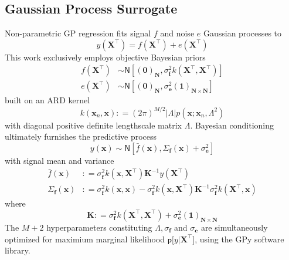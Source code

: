 \documentclass[preprint,12pt]{elsarticle}
\newcommand*{\M}[1]{\ensuremath{#1}\xspace}
\newcommand*{\vr}[1]{\M{\mathbf{#1}}}
\newcommand*{\deq}{\M{\mathrel{\mathop:}=}}
\newcommand*{\gauss}[2]{\mathsf{N}\!\left\lbrack{} #1 , #2 \right\rbrack}
\newcommand*{\modulus}[1]{\M{\left\lvert#1\right\rvert}}
\begin{document}
        \subsection{Gaussian Process Surrogate} \label{sub:Method:GP}
            Non-parametric GP regression fits signal $f$ and noise $e$ Gaussian processes to
            \begin{equation} \label{eq:Method:GP:Problem}
                y(\vr{X}^{\intercal}) = f(\vr{X}^{\intercal}) + e(\vr{X}^{\intercal})
            \end{equation}
            This work exclusively employs objective Bayesian priors
            \begin{align*}
                f(\vr{X}^{\intercal}) &\sim \gauss{(\vr{0})_{\vr{N}}}{\sigma_{\vr{f}}^{2} k(\vr{X}^{\intercal},\vr{X}^{\intercal})} \\
                e(\vr{X}^{\intercal}) &\sim \gauss{(\vr{0})_{\vr{N}}}{\sigma_{\vr{e}}^{2} (\vr{1})_{\vr{N}\times\vr{N}}} 
            \end{align*}
            built on an ARD kernel \cite{Wipf.Nagarajan2007, Neal1996}
            \begin{equation} \label{eq:Method:GP:Kernel}
                k(\vr{x}_{n},\vr{x}) \deq 
                (2 \pi)^{M/2} \modulus{\Lambda} p\!\left(\vr{x} ; \vr{x}_{n}, \Lambda^2\right) 
            \end{equation}
            with diagonal positive definite lengthscale matrix \(\Lambda\).
            Bayesian conditioning ultimately furnishes the predictive process
            \begin{equation*}
                y(\vr{x}) \sim \gauss{\bar{f}(\vr{x})}{\Sigma_{\vr{f}}(\vr{x}) + \sigma_{\vr{e}}^{2}}
            \end{equation*}
            with signal mean and variance
            \begin{equation} \label{eq:Method:GP:MeanAndVariance}
                \begin{aligned}
                    \bar{f}(\vr{x}) &\deq \sigma^{2}_\vr{f} k(\vr{x},\vr{X}^{\intercal})
                    \vr{K}^{-1} y(\vr{X}^{\intercal}) \\
                    \Sigma_{\vr{f}}(\vr{x}) &\deq \sigma^{2}_\vr{f} k(\vr{x},\vr{x})
                    - \sigma^{2}_\vr{f} k(\vr{x},\vr{X}^{\intercal})
                    \vr{K}^{-1} \sigma^{2}_\vr{f} k(\vr{X}^{\intercal},\vr{x})
                \end{aligned}
            \end{equation}
        where
            \begin{equation} \label{eq:Method:GP:KDef}
                \vr{K} \deq \sigma^{2}_\vr{f} k(\vr{X}^{\intercal},\vr{X}^{\intercal}) + \sigma_{\vr{e}}^{2} (\vr{1})_{\vr{N}\times\vr{N}}       
            \end{equation}
        The $M+2$ hyperparameters constituting $\Lambda, \sigma_{\vr{f}}$ and $\sigma_{\vr{e}}$ are simultaneously optimized for maximium marginal likelihood $\mathsf{p}\lbrack y \vert \vr{X}^{\intercal}\rbrack$, using the GPy software library.
\end{document}
